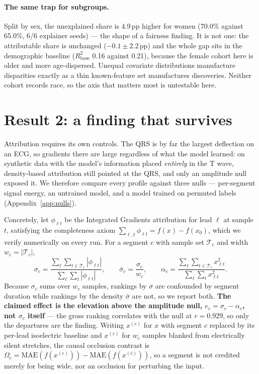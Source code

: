 \documentclass{article}
\begin{document}
\paragraph{The same trap for subgroups.} Split by sex, the unexplained share is
4.9\,pp higher for women (70.0\% against 65.0\%, 6/6 explainer seeds) --- the
shape of a fairness finding. It is not one: the attributable share is unchanged
($-0.1 \pm 2.2$\,pp) and the whole gap sits in the demographic baseline
($R^2_{\text{base}}$ 0.16 against 0.21), because the female cohort here is older
and more age-dispersed. Unequal covariate distributions manufacture disparities
exactly as a thin known-feature set manufactures discoveries. Neither cohort
records race, so the axis that matters most is untestable here.

\section{Result 2: a finding that survives}
\label{sec:survives}

Attribution requires its own controls. The QRS is by far the largest deflection
on an ECG, so gradients there are large regardless of what the model learned: on
synthetic data with the model's information placed \emph{entirely} in the T wave,
density-based attribution still pointed at the QRS, and only an amplitude null
exposed it. We therefore compare every profile against three nulls --- per-segment
signal energy, an untrained model, and a model trained on permuted labels
(Appendix~\ref{app:nulls}).

Concretely, let $\phi_{\ell t}$ be the Integrated Gradients attribution for lead
$\ell$ at sample $t$, satisfying the completeness axiom
$\sum_{\ell,t}\phi_{\ell t} = f(x) - f(x_0)$, which we verify numerically on
every run. For a segment $c$ with sample set $\mathcal{T}_c$ and width
$w_c = |\mathcal{T}_c|$,
\[
\sigma_c = \frac{\sum_{\ell}\sum_{t \in \mathcal{T}_c} |\phi_{\ell t}|}
                {\sum_{\ell}\sum_{t} |\phi_{\ell t}|},
\qquad
\bar{\sigma}_c = \frac{\sigma_c}{w_c},
\qquad
\alpha_c = \frac{\sum_{\ell}\sum_{t \in \mathcal{T}_c} x_{\ell t}^2}
                {\sum_{\ell}\sum_{t} x_{\ell t}^2} .
\]
Because $\sigma_c$ sums over $w_c$ samples, rankings by $\sigma$ are confounded
by segment duration while rankings by the density $\bar\sigma$ are not, so we
report both. \textbf{The claimed effect is the elevation above the amplitude
null, $e_c = \sigma_c - \alpha_c$, not $\sigma_c$ itself} --- the gross ranking
correlates with the null at $r = 0.929$, so only the departures are the finding.
Writing $x^{(c)}$ for $x$ with segment $c$ replaced by its per-lead isoelectric
baseline and $x^{(\bar{c})}$ for $w_c$ samples blanked from electrically silent
stretches, the causal occlusion contrast is
$\Omega_c = \mathrm{MAE}(f(x^{(c)})) - \mathrm{MAE}(f(x^{(\bar{c})}))$, so a
segment is not credited merely for being wide, nor an occlusion for perturbing
the input.
\end{document}
